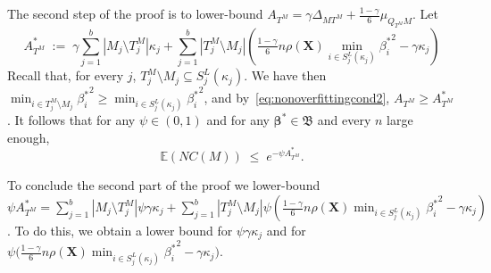 \documentclass[
  12pt]{article}
\newcommand{\E}{\mathbb{E}}
\newcommand{\bbeta}{\boldsymbol{\beta}}
\newcommand{\bX}{\mathbf{X}}
\newcommand{\bB}{\mathfrak{B}}
\begin{document}
The second step of the proof is to lower-bound $A_{T^M}=\gamma\Delta_{MT^M}+\tfrac{1-\gamma}{6}\mu_{Q_{T^M}M}$.
Let
$$A_{T^M}^*\;:=\;\gamma\sum_{j=1}^b|M_j \setminus T^M_j|\kappa_j + \sum_{j=1}^b |T^M_j\setminus M_j |\left(\tfrac{1-\gamma}{6} n \rho(\bX) \min_{i\in S_j^{L}(\kappa_j)}{\beta^*_i}^{2} - \gamma\kappa_j\right) $$
Recall that, for every $j$, $T^M_j\setminus M_j\subseteq S_j^{L}(\kappa_j)$. We have then $\min_{i\in T^M_j\setminus M_j}{\beta^*_i}^{2}\geq \min_{i\in S_j^{L}(\kappa_j)}{\beta^*_i}^{2}$, and by~\eqref{eq:nonoverfittingcond2}, $A_{T^M} \geq A_{T^M}^*$. It follows that for any $\psi\in(0,1)$ and for any $\bbeta^*\in\bB$ and every $n$ large enough,
\begin{equation}\label{eq:boundexp2}
    \E(NC(M))\;\leq\;e^{-\psi A_{T^M}^*}.
\end{equation}

To conclude the second part of the proof we lower-bound $\psi A^*_{T^M}=\sum_{j=1}^b|M_j \setminus T^M_j|\psi\gamma\kappa_j + \sum_{j=1}^b |T^M_j \setminus M_j|\psi\left(\tfrac{1-\gamma}{6} n \rho(\bX) \min_{i\in S_j^{L}(\kappa_j)}{\beta^*_i}^{2} - \gamma\kappa_j\right)$. To do this, we obtain a lower bound for $\psi \gamma \kappa_j$ and for $\psi\bigg(\tfrac{1-\gamma}{6} n \rho(\bX) \min_{i\in S_j^{L}(\kappa_j)}{\beta^*_i}^{2} - \gamma\kappa_j\bigg)$.
\end{document}
